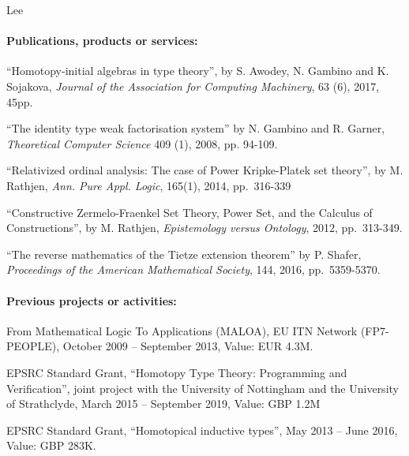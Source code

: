 \begin{sitedescription}{Lee}
\paragraph*{Publications, products or services:} 

\begin{compactitem}
\item ``Homotopy-initial algebras in type theory'', by S. Awodey, N. Gambino and K. Sojakova, 
{\em Journal of the Association for Computing Machinery}, 63 (6), 2017, 45pp.
\item ``The identity type weak factorisation system'' by N. Gambino and R. Garner, 
{\em Theoretical Computer Science} 409 (1), 2008, pp. 94-109.
\item ``Relativized ordinal analysis: The case of Power Kripke-Platek set theory'', by M. Rathjen, 
{\em Ann. Pure Appl. Logic}, 165(1), 2014, pp.~316-339 
\item ``Constructive Zermelo-Fraenkel Set Theory, Power Set, and the Calculus of Constructions'',
by M. Rathjen, {\em Epistemology versus Ontology}, 2012, pp.~313-349. 
\item ``The reverse mathematics of the Tietze extension theorem'' by P. Shafer,  
{\em Proceedings of the American Mathematical Society}, 144, 2016, pp.~5359-5370.
\end{compactitem}

\paragraph*{Previous projects or activities:}
 
\begin{compactitem}
\item From Mathematical Logic To Applications (MALOA), EU ITN Network (FP7-PEOPLE), October 2009 -- September 2013, Value: EUR 4.3M.
\item EPSRC Standard Grant, ``Homotopy Type Theory: Programming and Verification'', joint project with the University of Nottingham and the University of Strathclyde, March 2015 -- September 2019, Value: GBP 1.2M
\item EPSRC Standard Grant, ``Homotopical inductive types'', May 2013 -- June 2016, Value: GBP 283K.
\end{compactitem}

%


\end{sitedescription}
